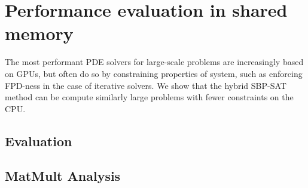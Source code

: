 
\section{Performance evaluation in shared memory}
\noindent 
The most performant PDE solvers for large-scale problems are increasingly based on GPUs, but often do so by constraining properties of system, such as enforcing FPD-ness in the case of iterative solvers. We show that the hybrid SBP-SAT method can be compute similarly large problems with fewer constraints on the CPU.  

\subsection{Evaluation}




\subsection{MatMult Analysis}



%	


%	

